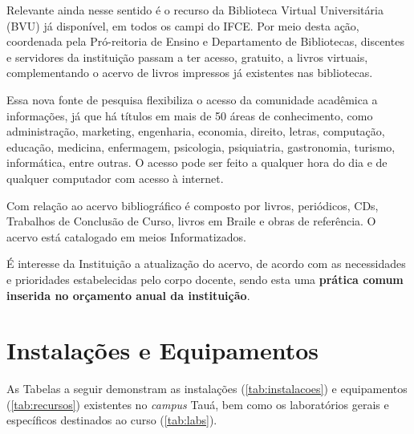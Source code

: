\documentclass[
	12pt,				%
	openright,			%
	twoside,			%
	a4paper,			%
	chapter=TITLE,		%
	english,			%
	french,				%
	spanish,			%
	brazil,				%
	]{abntex2}
\begin{document}
Relevante ainda nesse sentido é o recurso da Biblioteca Virtual Universitária (BVU) já disponível, em todos os campi do IFCE. Por meio desta  ação, coordenada pela Pró-reitoria de Ensino e Departamento de Bibliotecas, discentes e servidores da instituição passam a ter acesso, gratuito, a  livros virtuais, complementando o acervo de livros impressos já existentes nas bibliotecas. 

Essa nova fonte de pesquisa flexibiliza o acesso da comunidade acadêmica a informações, já que há títulos em mais de 50 áreas de conhecimento, como administração, marketing, engenharia, economia, direito, letras, computação, educação, medicina, enfermagem, psicologia, psiquiatria, gastronomia, turismo, informática,  entre outras. O acesso pode ser feito a qualquer hora do dia e de qualquer computador com acesso à internet.

Com relação ao acervo bibliográfico é composto por livros, periódicos, CDs, Trabalhos de Conclusão de Curso, livros em Braile e  obras de referência. O acervo está catalogado em meios Informatizados.

É interesse da Instituição a atualização do acervo, de acordo com as necessidades e prioridades estabelecidas pelo corpo docente, sendo esta uma \textbf{prática comum inserida no orçamento anual da instituição}.


\section{Instalações e Equipamentos}

As Tabelas a seguir demonstram as instalações (\autoref{tab:instalacoes}) e equipamentos (\autoref{tab:recursos}) existentes no \textit{campus} Tauá, bem como os laboratórios gerais  e específicos destinados ao curso (\autoref{tab:labs}).  

\renewcommand{\arraystretch}{1.1}
\end{document}
